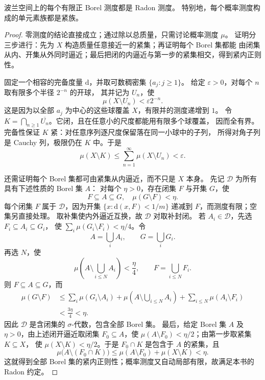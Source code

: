 \begin{lemma}\label{b1:lem:polish-probability-radon}
波兰空间上的每个有限正 Borel 测度都是 Radon 测度。
特别地，每个概率测度构成的单元素族都是紧族。
\end{lemma}
\begin{proof}
零测度的结论直接成立；通过除以总质量，只需讨论概率测度 \(\mu\)。
证明分三步进行：先为 \(X\) 构造质量任意接近一的紧集；再证明每个 Borel 集都能
由闭集从内、开集从外同时逼近；最后把闭的内逼近与第一步的紧集相交，得到紧内正则性。

固定一个相容的完备度量 \(\mathrm{d}\)，并取可数稠密集 \(\{a_j:j\geq1\}\)。
给定 \(\varepsilon>0\)，对每个 \(n\) 取有限多个半径 \(2^{-n}\) 的开球，
其并记为 \(U_n\)，使
\[
 \mu(X\setminus U_n)<\varepsilon 2^{-n}.
\]
这是因为以全部 \(a_j\) 为中心的这些球覆盖 \(X\)，有限并的测度递增到 \(1\)。
令 \(K=\bigcap_{n\geq1}\overline{U_n}\)。它闭，且在任意小的尺度都能用有限多个球覆盖，
因而全有界。完备性保证 \(K\) 紧：对任意序列逐尺度保留落在同一小球中的子列，
所得对角子列是 Cauchy 列，极限仍在 \(K\) 中。于是
\[
 \mu(X\setminus K)
 \leq\sum_{n=1}^{\infty}\mu(X\setminus U_n)<\varepsilon.
\]

还需证明每个 Borel 集都可由紧集从内逼近，而不只是 \(X\) 本身。
先记 \(\mathcal D\) 为所有具有下述性质的 Borel 集 \(A\)：
对每个 \(\eta>0\)，存在闭集 \(F\) 与开集 \(G\)，使
\[
 F\subseteq A\subseteq G,\quad \mu(G\setminus F)<\eta.
\]
每个闭集 \(F\) 属于 \(\mathcal D\)，因为开集
\(\{x:\mathrm{d}(x,F)<1/m\}\) 递减到 \(F\)，而测度有限；空集另直接处理。
取补集使内外逼近互换，故 \(\mathcal D\) 对取补封闭。
若 \(A_i\in\mathcal D\)，先选 \(F_i\subseteq A_i\subseteq G_i\)，
使 \(\sum_i\mu(G_i\setminus F_i)<\eta/4\)。令
\[
 A=\bigcup_iA_i,\qquad G=\bigcup_iG_i.
\]
再选 \(N\)，使
\[
 \mu\left(A\setminus\bigcup_{i\leq N}A_i\right)<\frac\eta4,
 \qquad F=\bigcup_{i\leq N}F_i.
\]
则 \(F\subseteq A\subseteq G\)，而
\[
 \begin{aligned}
 \mu(G\setminus F)
 &\leq \sum_i\mu(G_i\setminus A_i)
   +\mu\left(A\setminus\bigcup_{i\leq N}A_i\right)
   +\sum_{i\leq N}\mu(A_i\setminus F_i)\\
 &<\frac{3\eta}{4}<\eta.
 \end{aligned}
\]
因此 \(\mathcal D\) 是含闭集的 \(\sigma\)-代数，包含全部 Borel 集。
最后，给定 Borel 集 \(A\) 及 \(\eta>0\)，由上述闭开逼近取闭集
\(F_0\subseteq A\)，使 \(\mu(A\setminus F_0)<\eta/2\)；由第一步取紧集 \(K\subseteq X\)，
使 \(\mu(X\setminus K)<\eta/2\)。于是 \(F_0\cap K\) 是包含于 \(A\) 的紧集，且
\[
 \mu\bigl(A\setminus(F_0\cap K)\bigr)
 \leq\mu(A\setminus F_0)+\mu(X\setminus K)<\eta.
\]
这就得到全部 Borel 集的紧内正则性；概率测度又自动局部有限，故满足本书的 Radon 约定。
\end{proof}

